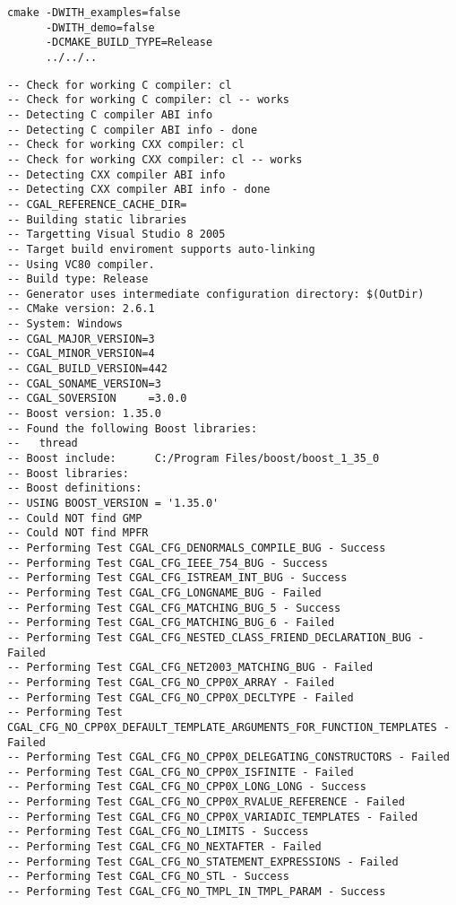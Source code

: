 {{\ccTexHtml{\scriptsize}{}
\begin{verbatim}
cmake -DWITH_examples=false 
      -DWITH_demo=false 
      -DCMAKE_BUILD_TYPE=Release 
      ../../..
\end{verbatim}
}


{\ccTexHtml{\scriptsize}{}
\begin{verbatim}
-- Check for working C compiler: cl
-- Check for working C compiler: cl -- works
-- Detecting C compiler ABI info
-- Detecting C compiler ABI info - done
-- Check for working CXX compiler: cl
-- Check for working CXX compiler: cl -- works
-- Detecting CXX compiler ABI info
-- Detecting CXX compiler ABI info - done
-- CGAL_REFERENCE_CACHE_DIR=
-- Building static libraries
-- Targetting Visual Studio 8 2005
-- Target build enviroment supports auto-linking
-- Using VC80 compiler.
-- Build type: Release
-- Generator uses intermediate configuration directory: $(OutDir)
-- CMake version: 2.6.1
-- System: Windows
-- CGAL_MAJOR_VERSION=3
-- CGAL_MINOR_VERSION=4
-- CGAL_BUILD_VERSION=442
-- CGAL_SONAME_VERSION=3
-- CGAL_SOVERSION     =3.0.0
-- Boost version: 1.35.0
-- Found the following Boost libraries:
--   thread
-- Boost include:      C:/Program Files/boost/boost_1_35_0
-- Boost libraries:    
-- Boost definitions:  
-- USING BOOST_VERSION = '1.35.0'
-- Could NOT find GMP
-- Could NOT find MPFR
-- Performing Test CGAL_CFG_DENORMALS_COMPILE_BUG - Success
-- Performing Test CGAL_CFG_IEEE_754_BUG - Success
-- Performing Test CGAL_CFG_ISTREAM_INT_BUG - Success
-- Performing Test CGAL_CFG_LONGNAME_BUG - Failed
-- Performing Test CGAL_CFG_MATCHING_BUG_5 - Success
-- Performing Test CGAL_CFG_MATCHING_BUG_6 - Failed
-- Performing Test CGAL_CFG_NESTED_CLASS_FRIEND_DECLARATION_BUG - Failed
-- Performing Test CGAL_CFG_NET2003_MATCHING_BUG - Failed
-- Performing Test CGAL_CFG_NO_CPP0X_ARRAY - Failed
-- Performing Test CGAL_CFG_NO_CPP0X_DECLTYPE - Failed
-- Performing Test CGAL_CFG_NO_CPP0X_DEFAULT_TEMPLATE_ARGUMENTS_FOR_FUNCTION_TEMPLATES - Failed
-- Performing Test CGAL_CFG_NO_CPP0X_DELEGATING_CONSTRUCTORS - Failed
-- Performing Test CGAL_CFG_NO_CPP0X_ISFINITE - Failed
-- Performing Test CGAL_CFG_NO_CPP0X_LONG_LONG - Success
-- Performing Test CGAL_CFG_NO_CPP0X_RVALUE_REFERENCE - Failed
-- Performing Test CGAL_CFG_NO_CPP0X_VARIADIC_TEMPLATES - Failed
-- Performing Test CGAL_CFG_NO_LIMITS - Success
-- Performing Test CGAL_CFG_NO_NEXTAFTER - Failed
-- Performing Test CGAL_CFG_NO_STATEMENT_EXPRESSIONS - Failed
-- Performing Test CGAL_CFG_NO_STL - Success
-- Performing Test CGAL_CFG_NO_TMPL_IN_TMPL_PARAM - Success

\end{verbatim}}}
